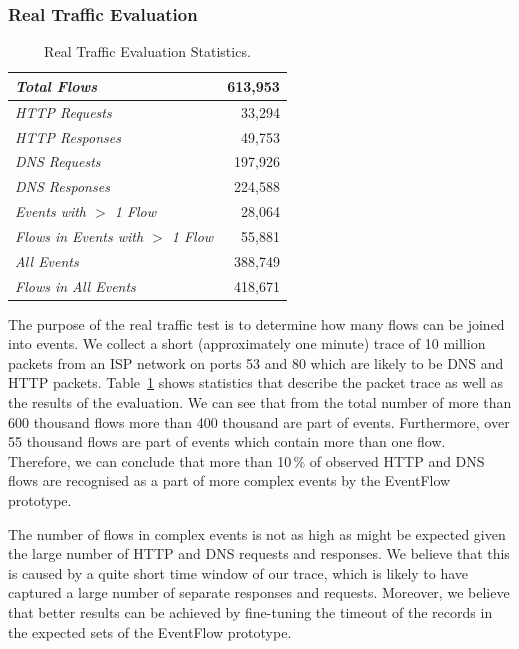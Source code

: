 \subsubsection{Real Traffic Evaluation}

\begin{table}[!tb]
    \centering
    \renewcommand{\arraystretch}{1.1}
    \begin{tabular}{|l|r|} \hline
        \textit{Total Flows} & 613,953 \\ \hline
        \textit{HTTP Requests} & 33,294  \\  \hline
        \textit{HTTP Responses} & 49,753  \\  \hline
        \textit{DNS Requests} & 197,926  \\  \hline
        \textit{DNS Responses} & 224,588  \\  \hline
        \textit{Events with $>$ 1 Flow} & 28,064  \\  \hline
        \textit{Flows in Events with $>$ 1 Flow} & 55,881  \\  \hline
        \textit{All Events} & 388,749 \\  \hline
        \textit{Flows in All Events} & 418,671 \\  \hline
    \end{tabular}
    \caption{Real Traffic Evaluation Statistics.}
    \label{tab:eventflow-stats}
\end{table}

The purpose of the real traffic test is to determine how many flows can be joined into events. We collect a short (approximately one minute) trace of 10 million packets from an ISP network on ports 53 and 80 which are likely to be DNS and HTTP packets. Table~\ref{tab:eventflow-stats} shows statistics that describe the packet trace as well as the results of the evaluation. We can see that from the total number of more than 600 thousand flows more than 400 thousand are part of events. Furthermore, over 55 thousand flows are part of events which contain more than one flow. Therefore, we can conclude that more than 10\,\% of observed HTTP and DNS flows are recognised as a part of more complex events by the EventFlow prototype.

The number of flows in complex events is not as high as might be expected given the large number of HTTP and DNS requests and responses. We believe that this is caused by a quite short time window of our trace, which is likely to have captured a large number of separate responses and requests. Moreover, we believe that better results can be achieved by fine-tuning the timeout of the records in the expected sets of the EventFlow prototype.


